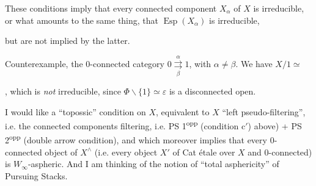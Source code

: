\noindent These conditions imply that every connected component $X_{\alpha}$ of $X$ is irreducible, or what amounts to the same thing, that $\operatorname{Esp}(X_{\alpha})$ is irreducible,


\noindent but are not implied by the latter.

Counterexample, the 0-connected category $0 \underset{\beta}{\overset{\alpha}{\rightrightarrows}} 1$, with $\alpha \neq \beta$. We have $X/1 \simeq$
, which is \textit{not} irreducible, since $\Phi \backslash \{1\} \simeq \varepsilon$ is a disconnected open.

I would like a ``topossic'' condition on $X$, equivalent to $X$ ``left pseudo-filtering'', i.e. the connected components filtering, i.e. PS 1\textsuperscript{opp} (condition c$'$) above) + PS 2\textsuperscript{opp} (double arrow condition), and which moreover implies that every 0-connected object of $X^{\wedge}$ (i.e. every object $X'$ of Cat étale over $X$ and 0-connected) is $W_{\infty}$-aspheric. And I am thinking of the notion of ``total asphericity'' of Pursuing Stacks.

